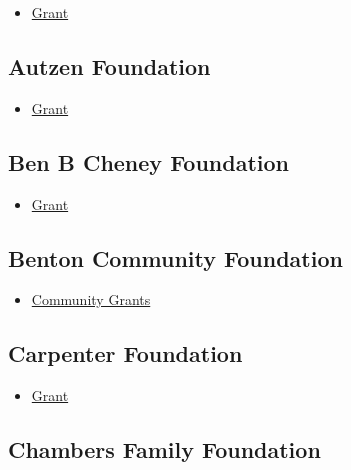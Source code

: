 \documentclass[
  letterpaper,
  DIV=11,
  numbers=noendperiod]{scrreprt}
\providecommand{\tightlist}{%
  \setlength{\itemsep}{0pt}\setlength{\parskip}{0pt}}\usepackage{longtable,booktabs,array}
\begin{document}
\begin{itemize}
\tightlist
\item
  \href{http://www.annamay.org/}{Grant}
\end{itemize}

\subsection{Autzen Foundation}\label{autzen-foundation}

\begin{itemize}
\tightlist
\item
  \href{https://www.autzenfoundation.org/deadlines}{Grant}
\end{itemize}

\subsection{Ben B Cheney Foundation}\label{ben-b-cheney-foundation}

\begin{itemize}
\tightlist
\item
  \href{https://www.benbcheneyfoundation.org/}{Grant}
\end{itemize}

\subsection{Benton Community
Foundation}\label{benton-community-foundation}

\begin{itemize}
\tightlist
\item
  \href{https://bcfgives.org/wp-content/uploads/2024/02/2023-Full-Grant-History.pdf}{Community
  Grants}
\end{itemize}

\subsection{Carpenter Foundation}\label{carpenter-foundation}

\begin{itemize}
\tightlist
\item
  \href{http://carpenter-foundation.org/}{Grant}
\end{itemize}

\subsection{Chambers Family
Foundation}\label{chambers-family-foundation}
\end{document}
